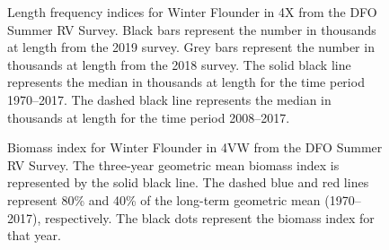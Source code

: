 \documentclass[11pt]{book}
\begin{document}
\begin{figure}[htb]

{\centering {} 

}

\caption{Length frequency indices for Winter Flounder in 4X from the DFO Summer RV Survey. Black bars represent the number in thousands at length from the 2019 survey. Grey bars represent the number in thousands at length from the 2018 survey. The solid black line represents the median in thousands at length for the time period 1970--2017. The dashed black line represents the median in thousands at length for the time period 2008--2017.}\label{fig:62-fig-winterflounder-lengthfreq4X}
\end{figure}

\begin{figure}[htb]

{\centering {} 

}

\caption{Biomass index for Winter Flounder in 4VW from the DFO Summer RV Survey. The three-year geometric mean biomass index is represented by the solid black line. The dashed blue and red lines represent 80\% and 40\% of the long-term geometric mean (1970--2017), respectively. The black dots represent the biomass index for that year.}\label{fig:63-fig-winterflounder-biomass4VW}
\end{figure}
\end{document}
